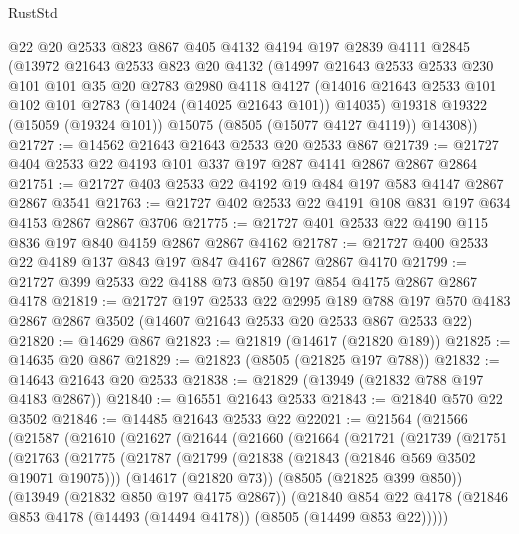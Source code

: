 \begin{lexlean}{RustStd}
\begin{coremodule}
    @22
    @20
    @2533
    @823
    @867
    @405
    @4132
    @4194
    @197
    @2839
    @4111
    @2845
    (@13972
      @21643
      @2533
      @823
      @20
      @4132
      (@14997
        @21643
        @2533
        @2533
        @230
        @101
        @101
        @35
        @20
        @2783
        @2980
        @4118
        @4127
        (@14016 @21643 @2533 @101 @102 @101 @2783 (@14024 (@14025 @21643 @101)) @14035)
        @19318
        @19322
        (@15059 (@19324 @101))
        @15075
        (@8505 (@15077 @4127 @4119))
        @14308))
@21727 := @14562 @21643 @21643 @2533 @20 @2533 @867
@21739 := @21727 @404 @2533 @22 @4193 @101 @337 @197 @287 @4141 @2867 @2867 @2864
@21751 := @21727 @403 @2533 @22 @4192 @19 @484 @197 @583 @4147 @2867 @2867 @3541
@21763 := @21727 @402 @2533 @22 @4191 @108 @831 @197 @634 @4153 @2867 @2867 @3706
@21775 := @21727 @401 @2533 @22 @4190 @115 @836 @197 @840 @4159 @2867 @2867 @4162
@21787 := @21727 @400 @2533 @22 @4189 @137 @843 @197 @847 @4167 @2867 @2867 @4170
@21799 := @21727 @399 @2533 @22 @4188 @73 @850 @197 @854 @4175 @2867 @2867 @4178
@21819 := @21727
    @197
    @2533
    @22
    @2995
    @189
    @788
    @197
    @570
    @4183
    @2867
    @2867
    @3502
    (@14607 @21643 @2533 @20 @2533 @867 @2533 @22)
@21820 := @14629 @867
@21823 := @21819 (@14617 (@21820 @189))
@21825 := @14635 @20 @867
@21829 := @21823 (@8505 (@21825 @197 @788))
@21832 := @14643 @21643 @20 @2533
@21838 := @21829 (@13949 (@21832 @788 @197 @4183 @2867))
@21840 := @16551 @21643 @2533
@21843 := @21840 @570 @22 @3502
@21846 := @14485 @21643 @2533 @22
@22021 := @21564
    (@21566
      (@21587
        (@21610
          (@21627
            (@21644
              (@21660
                (@21664
                  (@21721
                    (@21739
                      (@21751
                        (@21763
                          (@21775
                            (@21787
                              (@21799
                                (@21838 (@21843 (@21846 @569 @3502 @19071 @19075)))
                                (@14617 (@21820 @73))
                                (@8505 (@21825 @399 @850))
                                (@13949 (@21832 @850 @197 @4175 @2867))
                                (@21840
                                  @854
                                  @22
                                  @4178
                                  (@21846
                                    @853
                                    @4178
                                    (@14493 (@14494 @4178))
                                    (@8505 (@14499 @853 @22)))))

\end{coremodule}
\end{lexlean}
